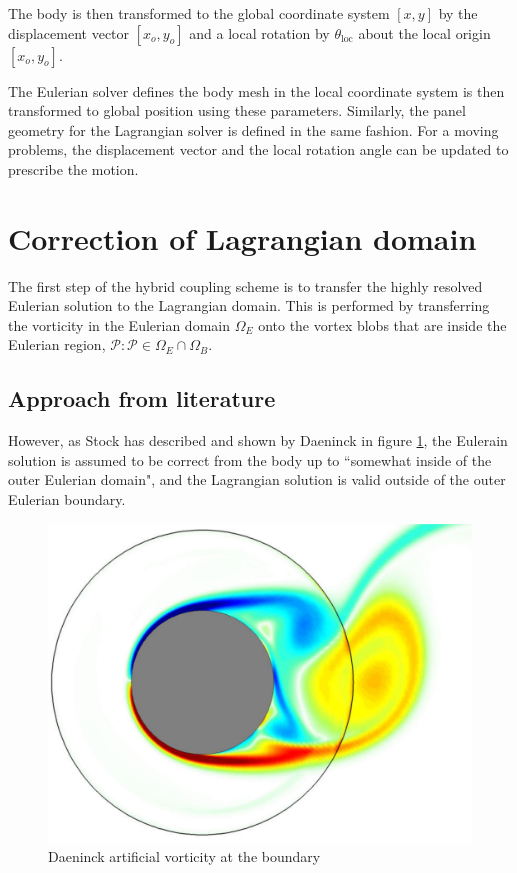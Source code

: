 The body is then transformed to the global coordinate system $[x,y]$ by the displacement vector $[x_o,y_o]$ and a local rotation by $\theta_{\mathrm{loc}}$ about the local origin $[x_o,y_o]$. 

The Eulerian solver defines the body mesh in the local coordinate system is then transformed to global position using these parameters. Similarly, the panel geometry for the Lagrangian solver is defined in the same fashion. For a moving problems, the displacement vector and the local rotation angle can be updated to prescribe the motion.


\section{Correction of Lagrangian domain}

The first step of the hybrid coupling scheme is to transfer the highly resolved Eulerian solution to the Lagrangian domain. This is performed by transferring the vorticity in the Eulerian domain $\Omega_E$ onto the vortex blobs that are inside the Eulerian region, $\mathcal{P}: \mathcal{P} \in \Omega_E \cap \Omega_B$.
				
\subsection{Approach from literature}		
							
However, as Stock has described \cite{} and shown by Daeninck in figure \ref{fig:daeninck_CylinderVorticity}, the Eulerain solution is assumed to be correct from the body up to ``somewhat inside of the outer Eulerian domain", and the Lagrangian solution is valid outside of the outer Eulerian boundary. 

	\begin{figure}[h]
	\centering
	\includegraphics[width=0.5\linewidth]{./figures/hybrid/daeninck_CylinderVorticity.png}
	\caption{Daeninck artificial vorticity at the boundary}
	\label{fig:daeninck_CylinderVorticity}
	\end{figure}

